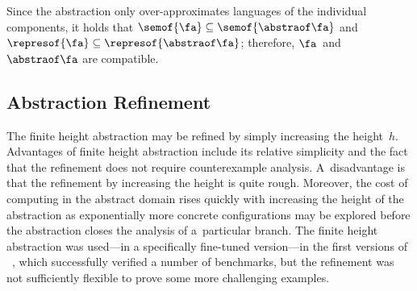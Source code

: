 %
Since the abstraction only over-approximates languages of the individual components,
it holds that 
$\semof{\fa}\subseteq\semof{\abstraof \fa}$
and
$\represof{\fa}\subseteq\represof{\abstraof \fa }$; therefore, $\fa$~and $\abstraof \fa$ are compatible. 
%

\subsection{Abstraction Refinement}\label{sec:label}

The finite height abstraction may be refined by simply increasing the
height~$h$.
%
Advantages of finite height abstraction include its relative simplicity and the
fact that the refinement does not require counterexample analysis.  
%
A~disadvantage is 
%
%
%
that the refinement by increasing the height is quite rough.
Moreover, the cost of computing in the abstract domain rises quickly with increasing
the height of the abstraction as exponentially more concrete configurations may be explored
before the abstraction closes the analysis of a~particular branch.
%
%
The finite height abstraction was used---in a specifically fine-tuned
version---in the first versions of \forester{}~\cite{forester11,boxes13}, which
successfully verified a number of benchmarks, but the refinement was not
sufficiently flexible to prove some more challenging examples. 

